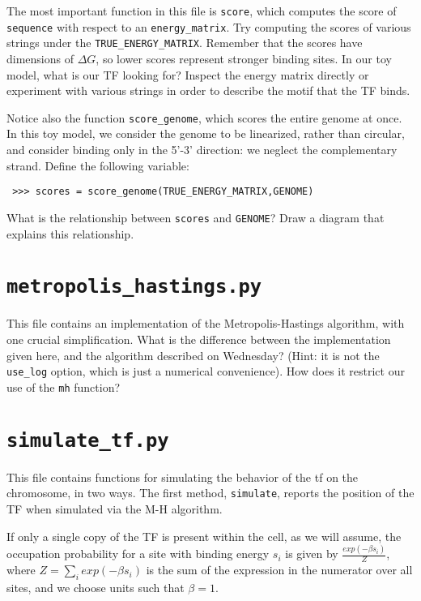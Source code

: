\documentclass[11pt]{article}
\begin{document}
  The most important function in this file is \texttt{score}, which computes
  the score of \texttt{sequence} with respect to an \texttt{energy\_matrix}.  Try
  computing the scores of various strings under the
  \texttt{TRUE\_ENERGY\_MATRIX}.  Remember that the scores have dimensions of
  $\Delta G$, so lower scores represent stronger binding sites.  In
  our toy model, what is our TF looking for?  Inspect the energy
  matrix directly or experiment with various strings in order to
  describe the motif that the TF binds.

  Notice also the function \texttt{score\_genome}, which scores the entire
  genome at once.  In this toy model, we consider the genome to be
  linearized, rather than circular, and consider binding only in the
  5'-3' direction: we neglect the complementary strand.  Define the
  following variable:

\begin{verbatim}
 >>> scores = score_genome(TRUE_ENERGY_MATRIX,GENOME)
\end{verbatim}

  What is the relationship between \texttt{scores} and \texttt{GENOME}?  Draw a
  diagram that explains this relationship.
\section{\texttt{metropolis\_hastings.py}}
\label{sec-5}


  This file contains an implementation of the Metropolis-Hastings
  algorithm, with one crucial simplification.  What is the difference
  between the implementation given here, and the algorithm described
  on Wednesday?  (Hint: it is not the \texttt{use\_log} option, which is just a
  numerical convenience).  How does it restrict our use of the \texttt{mh}
  function?
\section{\texttt{simulate\_tf.py}}
\label{sec-6}


  This file contains functions for simulating the behavior of the tf
  on the chromosome, in two ways.  The first method, \texttt{simulate},
  reports the position of the TF when simulated via the M-H algorithm.

  If only a single copy of the TF is present within the cell, as we
  will assume, the occupation probability for a site with binding
  energy $s_i$ is given by $\frac{exp(-\beta s_i)}{Z}$, where
  $Z=\sum_i exp(-\beta s_i)$ is the sum of the expression in the
  numerator over all sites, and we choose units such that $\beta=1$.
\end{document}
